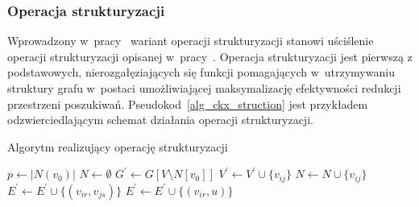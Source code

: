 \subsubsection{\textbf{Operacja strukturyzacji}}\label{sss_ckx_struction}
\par{
  Wprowadzony w~pracy~\cite{ImprovedBounds10} wariant operacji strukturyzacji stanowi uściślenie operacji strukturyzacji opisanej w~pracy~\cite{Ebengger:1984}.
  Operacja strukturyzacji jest pierwszą z podstawowych, nierozgałęziających się funkcji pomagających w~utrzymywaniu struktury grafu w~postaci umożliwiającej maksymalizację efektywności redukcji przestrzeni poszukiwań.
  Pseudokod~\ref{alg_ckx_struction} jest przykładem odzwierciedlającym schemat działania operacji strukturyzacji.
  \begin{algorithm}
    \caption{Algorytm realizujący operację strukturyzacji}\label{alg_ckx_struction}
    \begin{algorithmic}[1]



        \State $p \gets |N(v_0)|$
        \State $N \gets \emptyset$
        \State $G^\prime \gets G[V \setminus N[v_0]]$
              \State $V^\prime \gets V^\prime \cup \{v_{ij}\}$
              \State $N \gets N \cup \{v_{ij}\}$
            \EndIf
          \EndFor
        \EndFor
              \State $E^\prime \gets E^\prime \cup \{(v_{ir}, v_{js})\}$
            \EndIf
          \EndFor
              \State$E^\prime \gets E^\prime \cup \{(v_{ir}, u)\}$
            \EndIf
          \EndFor
        \EndFor
      \EndFunction
    \end{algorithmic}
  \end{algorithm}
}
